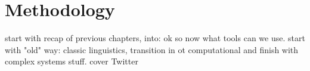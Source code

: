 \documentclass[../thesis.tex]{subfiles}
\begin{document}
\chapter{Methodology}
\label{ch:methods}

start with recap of previous chapters, into: ok so now what tools can we use. start with "old" way: classic linguistics, transition in ot computational and finish with complex systems stuff.
\cite{NguyenComputationalSociolinguistics2016}
cover Twitter 
\end{document}

